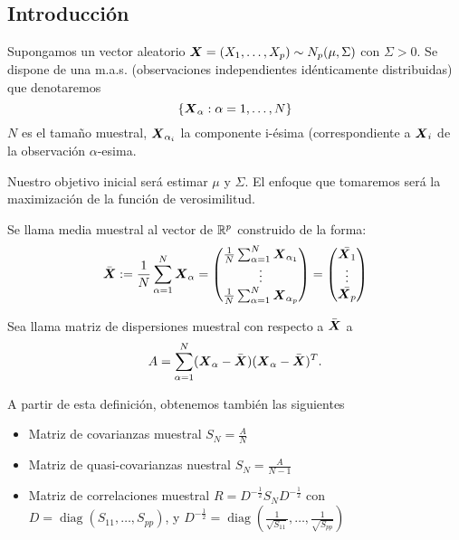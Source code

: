 \subsection{Introducción}

Supongamos un vector aleatorio $\boldsymbol{X} = (X_1,\dots,X_p)\sim N_p(\mu,\Sigma)$ con $\Sigma > 0$. Se dispone de una m.a.s. (observaciones independientes idénticamente distribuidas) que denotaremos
\[
\{\boldsymbol{X}_\alpha: \alpha= 1 ,\dots,N\}
\]
$N$ es el tamaño muestral, $\boldsymbol{X}_{\alpha_i}$ la componente i-ésima (correspondiente a $\boldsymbol{X}_i$ de la observación $\alpha$-esima.

Nuestro objetivo inicial será estimar $\mu$ y $\Sigma$. El enfoque que tomaremos será la maximización de la función de verosimilitud.

\begin{ndef}
  Se llama media muestral al vector de $\mathbb{R}^p$ construido de la forma:
  \[
  \bar{\boldsymbol{X}}:= \frac{1}{N} \sum_{\alpha = 1 }^N \boldsymbol{X}_\alpha = \begin{pmatrix}\frac{1}{N} \sum_{\alpha = 1 }^N \boldsymbol{X}_{\alpha_1} \\ \vdots \\ \frac{1}{N} \sum_{\alpha = 1 }^N \boldsymbol{X}_{\alpha_p}\end{pmatrix} = \begin{pmatrix}\bar{\boldsymbol{X}_1} \\ \vdots \\ \bar{\boldsymbol{X}_p} \end{pmatrix}
  \]
\end{ndef}

\begin{ndef}
  Sea llama matriz de dispersiones muestral con respecto a $\bar{\boldsymbol{X}}$ a
  \[
  A = \sum_{\alpha = 1}^N (\boldsymbol{X}_\alpha - \bar{\boldsymbol{X}})(\boldsymbol{X}_\alpha - \bar{\boldsymbol{X}})^T.
  \]
\end{ndef}

A partir de esta definición, obtenemos también las siguientes
\begin{itemize}
\item Matriz de covarianzas muestral $S_N = \frac{A}{N}$
\item Matriz de quasi-covarianzas nuestral $S_N = \frac{A}{N-1}$
  \item Matriz de correlaciones muestral $R =D^{-\frac{1}{2}}S_N D^{-\frac{1}{2}} $ con $D = \operatorname{diag}(S_{11},\dots, S_{pp})$, y $D^{-\frac{1}{2}} = \operatorname{diag}\left(\frac{1}{\sqrt{S_{11}}},\dots,\frac{1}{\sqrt{S_{pp}}}\right)$
\end{itemize}


